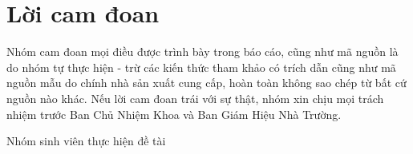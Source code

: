 \chapter*{Lời cam đoan}
\vspace{1.0cm}
Nhóm cam đoan mọi điều được trình bày trong báo cáo, cũng như mã nguồn là do nhóm tự thực hiện - trừ các kiến thức tham khảo có trích dẫn cũng như mã nguồn mẫu do chính nhà sản xuất cung cấp, hoàn toàn không sao chép từ bất cứ nguồn nào khác. Nếu lời cam đoan trái với sự thật, nhóm xin chịu mọi trách nhiệm trước Ban Chủ Nhiệm Khoa và Ban
Giám Hiệu Nhà Trường.
\begin{flushright}
Nhóm sinh viên thực hiện đề tài 
\end{flushright}


\bigskip
